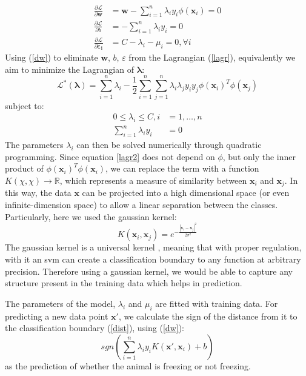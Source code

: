 \begin{align}\label{dw}
    \frac{\partial\mathcal{L}}{\partial\mathbf{w}} &= \mathbf{w} - \sum_{i=1}^n \lambda_i  y_i  \phi(\mathbf{x}_i) = 0 \\ 
    \frac{\partial\mathcal{L}}{\partial{b}} &= - \sum_{i=1}^n \lambda_i y_i = 0 \\
    \frac{\partial\mathcal{L}}{\partial{\mathbf{\varepsilon_i}}} &= C - \lambda_i - \mu_i = 0, \forall i 
\end{align}
Using (\ref{dw}) to eliminate $\mathbf{w}$, $b$, $\varepsilon$ from the Lagrangian (\ref{lagr}), equivalently we aim to minimize the Lagrangian of $\mathbf{\lambda}$:
\begin{equation} \label{lagr2}
    \mathcal{L}^*(\mathbf{\lambda}) = \sum_{i=1}^{n} \lambda_i - \frac{1}{2}\sum_{i=1}^n \sum_{j=1}^n \lambda_i \lambda_j y_i y_j \phi(\mathbf{x}_i)^T\phi(\mathbf{x}_j)
\end{equation}
subject to:
\begin{align*}
    0 \leq \lambda_i \leq C, i &= 1,\ldots,n \\
    \sum_{i=1}^n \lambda_i y_i &= 0
\end{align*}
The parameters $\lambda_i$ can then be solved numerically through quadratic programming. Since equation \ref{lagr2} does not depend on $\phi$, but only the inner product of $\phi(\mathbf{x}_i)^T\phi(\mathbf{x}_i)$, we can replace the term with a function $K(\chi, \chi) \to \mathbb{R}$, which represents a measure of similarity between $\mathbf{x}_i$ and $ \mathbf{x}_j$. In this way, the data $\mathbf{x}$ can be projected into a high dimensional space (or even infinite-dimension space) to allow a linear separation between the classes. Particularly, here we used the gaussian kernel:
\begin{equation*}
    K(\mathbf{x}_i, \mathbf{x}_j) = e^{-\frac{|\mathbf{x}_i - \mathbf{x}_j|^2}{2\sigma^2}}
\end{equation*}
The gaussian kernel is a universal kernel , meaning that with proper regulation, with it an \gls{svm} can create a classification boundary to any function at arbitrary precision. Therefore using a gaussian kernel, we would be able to capture any structure present in the training data which helps in prediction.

The parameters of the model, $\lambda_i$ and $\mu_i$ are fitted with training data. For predicting a new data point $\mathbf{x}'$, we calculate the sign of the distance from it to the classification boundary (\ref{dist}), using (\ref{dw}):
\begin{equation*}
    sgn(\sum_{i=1}^n\lambda_iy_iK(\mathbf{x}', \mathbf{x}_i) + b)
\end{equation*}
as the prediction of whether the animal is freezing or not freezing.

